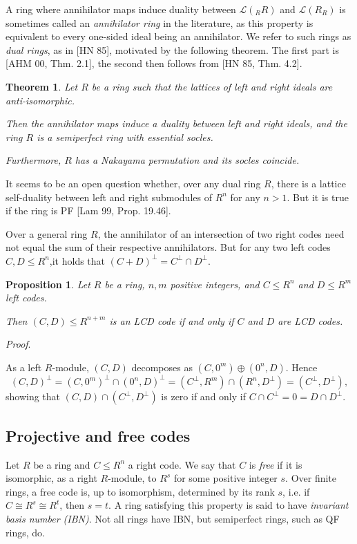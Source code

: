 \documentclass{article}
\theoremstyle{plain}
\newtheorem{Thm}[veta]{Theorem}
\newtheorem{Prop}[veta]{Proposition}
\theoremstyle{plain}
\theoremstyle{remark}
\theoremstyle{plain}
\newenvironment{dukaz}{
  \par\medskip \noindent
  \textit{Proof}.
}{

\rightline{$\qedsymbol$}
}
\begin{document}
A ring where annihilator maps induce duality between $\mathcal{L}({}_RR)$ and $\mathcal{L}(R_R)$ is sometimes called an \textit{annihilator ring} in the literature, as this property is equivalent to every one-sided ideal being an annihilator. We refer to such rings as \textit{dual rings}, as in [HN 85], motivated by the following theorem. The first part is [AHM 00, Thm. 2.1], the second then follows from [HN 85, Thm. 4.2].
\begin{Thm}\label{ThmHerbera}
Let $R$ be a ring such that the lattices of left and right ideals are anti-isomorphic.

Then the annihilator maps induce a duality between left and right ideals, and the ring $R$ is a semiperfect ring with essential socles. 

Furthermore, $R$ has a Nakayama permutation and its socles coincide. 
\end{Thm}
 It seems to be an open question whether, over any dual ring $R$, there is a lattice self-duality between left and right submodules of $R^n$ for any $n>1$. But it is true if the ring is PF  [Lam 99, Prop. 19.46]. 

\medskip 

Over a general ring $R$,  the annihilator of an intersection of two right codes need not equal the sum of their respective annihilators. But for any two left codes $C, D\leq R^n$,it holds that $(C+D)^\perp=C^\perp \cap D^\perp$.   
\begin{Prop}\label{PropProd}
    Let $R$ be a ring, $n, m$ positive integers, and $C\leq R^n$ and $D\leq R^m$ left codes.

    Then $(C, D)\leq R^{n+m}$ is an LCD code if and only if $C$ and $D$ are LCD codes.
\end{Prop}
\begin{dukaz}
    As a left $R$-module, $(C,D)$ decomposes as $(C, 0^m)\oplus (0^n, D)$. Hence 
    \[(C, D)^\perp =(C, 0^m)^\perp \cap(0^n, D)^\perp = (C^\perp, R^m)\cap (R^n, D^\perp)=(C^\perp, D^\perp),  \]
    showing that $(C, D)\cap (C^\perp, D^\perp)$ is zero if and only if $C\cap C^\perp = 0 =D\cap D^\perp$.
\end{dukaz}


\subsection{Projective and free codes}\label{Secproj}

Let $R$ be a ring and $C\leq R^n$ a right code. We say that $C$ is \textit{free} if it is isomorphic, as a right $R$-module, to $R^s$ for some positive integer $s$. Over finite rings, a free code is, up to isomorphism, determined by its rank $s$, i.e. if $C\cong R^s\cong R^t$, then $s=t$. A ring satisfying this property is said to have \textit{invariant basis number (IBN)}. Not all rings have IBN, but semiperfect rings, such as QF rings, do. 
\end{document}
